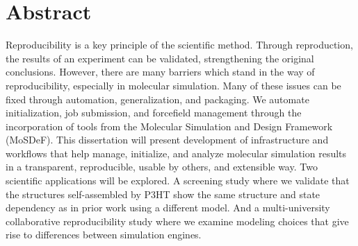 
\chapter*{Abstract}

Reproducibility is a key principle of the scientific method.
Through reproduction, the results of an experiment can be validated, strengthening the original conclusions.
However, there are many barriers which stand in the way of reproducibility, especially in molecular simulation.
Many of these issues can be fixed through automation, generalization, and packaging.
We automate initialization, job submission, and forcefield management through the incorporation of tools from the Molecular Simulation and Design Framework (MoSDeF). 
This dissertation will present development of infrastructure and workflows that help manage, initialize, and analyze molecular simulation results in a transparent, reproducible, usable by others, and extensible way. 
Two scientific applications will be explored.
A screening study where we validate that the structures self-assembled by P3HT show the same structure and state dependency as in prior work using a different model.
And a multi-university collaborative reproducibility study where we examine modeling choices that give rise to differences between simulation engines.

